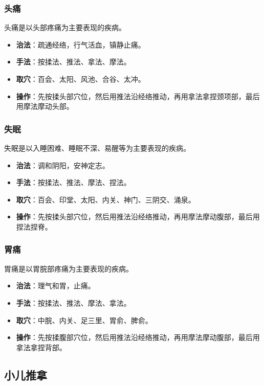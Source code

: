 \documentclass[12pt,UTF8]{ctexbook}
\begin{document}
\subsubsection{头痛}

头痛是以头部疼痛为主要表现的疾病。

\begin{itemize}
\item \textbf{治法}：疏通经络，行气活血，镇静止痛。
\item \textbf{手法}：按揉法、推法、拿法、摩法。
\item \textbf{取穴}：百会、太阳、风池、合谷、太冲。
\item \textbf{操作}：先按揉头部穴位，然后用推法沿经络推动，再用拿法拿捏颈项部，最后用摩法摩动头部。
\end{itemize}

\subsubsection{失眠}

失眠是以入睡困难、睡眠不深、易醒等为主要表现的疾病。

\begin{itemize}
\item \textbf{治法}：调和阴阳，安神定志。
\item \textbf{手法}：按揉法、推法、摩法、捏法。
\item \textbf{取穴}：百会、印堂、太阳、内关、神门、三阴交、涌泉。
\item \textbf{操作}：先按揉头部穴位，然后用推法沿经络推动，再用摩法摩动腹部，最后用捏法捏脊。
\end{itemize}

\subsubsection{胃痛}

胃痛是以胃脘部疼痛为主要表现的疾病。

\begin{itemize}
\item \textbf{治法}：理气和胃，止痛。
\item \textbf{手法}：按揉法、推法、摩法、拿法。
\item \textbf{取穴}：中脘、内关、足三里、胃俞、脾俞。
\item \textbf{操作}：先按揉腹部穴位，然后用推法沿经络推动，再用摩法摩动腹部，最后用拿法拿捏背部。
\end{itemize}

\subsection{小儿推拿}
\end{document}
